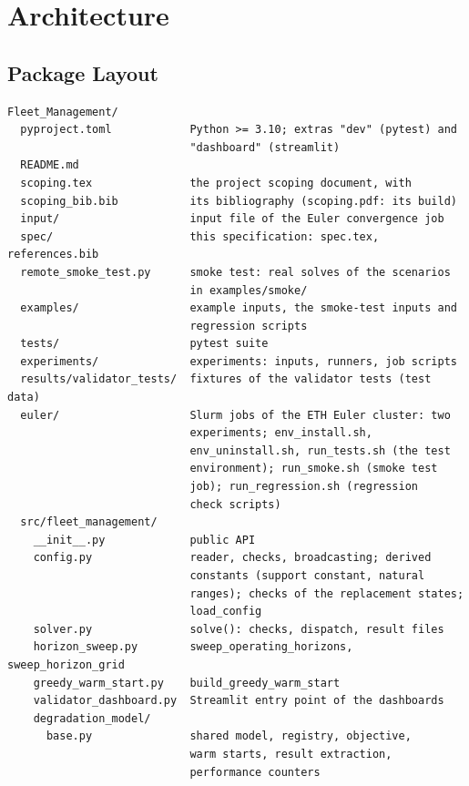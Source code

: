 \section{Architecture}
\label{sec:files}

\subsection{Package Layout}

\begin{lstlisting}
Fleet_Management/
  pyproject.toml            Python >= 3.10; extras "dev" (pytest) and
                            "dashboard" (streamlit)
  README.md
  scoping.tex               the project scoping document, with
  scoping_bib.bib           its bibliography (scoping.pdf: its build)
  input/                    input file of the Euler convergence job
  spec/                     this specification: spec.tex, references.bib
  remote_smoke_test.py      smoke test: real solves of the scenarios
                            in examples/smoke/
  examples/                 example inputs, the smoke-test inputs and
                            regression scripts
  tests/                    pytest suite
  experiments/              experiments: inputs, runners, job scripts
  results/validator_tests/  fixtures of the validator tests (test data)
  euler/                    Slurm jobs of the ETH Euler cluster: two
                            experiments; env_install.sh,
                            env_uninstall.sh, run_tests.sh (the test
                            environment); run_smoke.sh (smoke test
                            job); run_regression.sh (regression
                            check scripts)
  src/fleet_management/
    __init__.py             public API
    config.py               reader, checks, broadcasting; derived
                            constants (support constant, natural
                            ranges); checks of the replacement states;
                            load_config
    solver.py               solve(): checks, dispatch, result files
    horizon_sweep.py        sweep_operating_horizons, sweep_horizon_grid
    greedy_warm_start.py    build_greedy_warm_start
    validator_dashboard.py  Streamlit entry point of the dashboards
    degradation_model/
      base.py               shared model, registry, objective,
                            warm starts, result extraction,
                            performance counters

\end{lstlisting}
